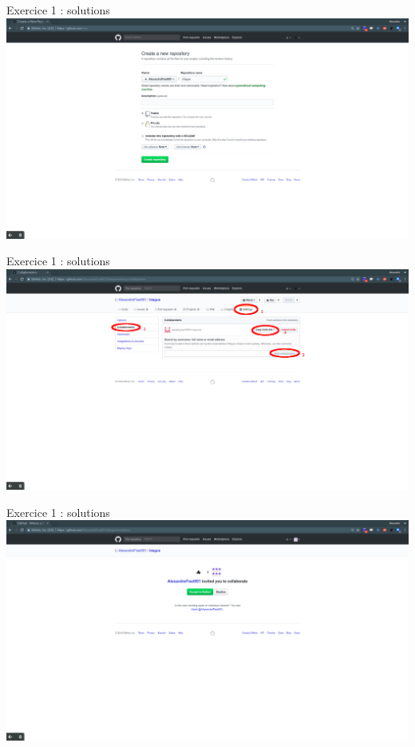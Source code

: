\documentclass{beamer}
\begin{document}
\begin{frame}{Exercice 1 : solutions}
	\centering
    \includegraphics[scale=0.16]{img/image_exercices/repo_config.png}
\end{frame}

\begin{frame}{Exercice 1 : solutions}
	\centering
    \includegraphics[scale=0.16]{img/image_exercices/add_collab.png}
\end{frame}

\begin{frame}{Exercice 1 : solutions}
	\centering
    \includegraphics[scale=0.16]{img/image_exercices/accept_invitation.png}
\end{frame}
\end{document}
